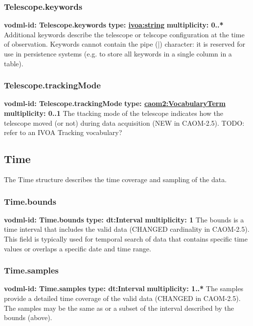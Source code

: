     \subsubsection{Telescope.keywords}
      \textbf{vodml-id: Telescope.keywords} \newline
      \textbf{type: \hyperref[sect:ivoa]{ivoa:string}} \newline
      \textbf{multiplicity: 0..*} \newline
      Additional keywords describe the telescope or telscope configuration at the time of observation. Keywords cannot contain the pipe (|) character: it is reserved for use in persistence systems (e.g. to store all keywords in a single column in a table).

    \subsubsection{Telescope.trackingMode}
      \textbf{vodml-id: Telescope.trackingMode} \newline
      \textbf{type: \hyperref[sect:VocabularyTerm]{caom2:VocabularyTerm}} \newline
      \textbf{multiplicity: 0..1} \newline
      The ttacking mode of the telescope indicates how the telescope moved (or not) during data acquisition (NEW in CAOM-2.5). TODO: refer to an IVOA Tracking vocabulary?

  \subsection{Time}
  \label{sect:Time}
    The Time structure describes the time coverage and sampling of the data.

    \subsubsection{Time.bounds}
      \textbf{vodml-id: Time.bounds} \newline
      \textbf{type: dt:Interval} \newline
      \textbf{multiplicity: 1} \newline
      The bounds is a time interval that includes the valid data (CHANGED cardinality in CAOM-2.5). This field is typically used for temporal search of data that contains specific time values or overlaps a specific date and time range.

    \subsubsection{Time.samples}
      \textbf{vodml-id: Time.samples} \newline
      \textbf{type: dt:Interval} \newline
      \textbf{multiplicity: 1..*} \newline
      The samples provide a detailed time coverage of the valid data (CHANGED in CAOM-2.5). The samples may be the same as or a subset of the interval described by the bounds (above).

